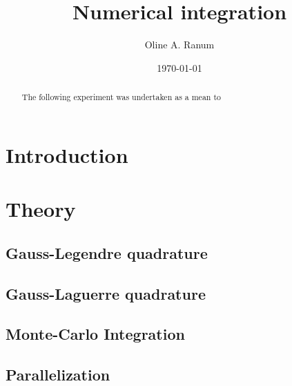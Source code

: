 \documentclass[%
reprint,
amsmath,amssymb,
aps,
]{revtex4-1}
\begin{document}
\title{Numerical integration}
\author{Oline A. Ranum}
\date{\today}


\begin{abstract}
	The following experiment was undertaken as a mean to 
\end{abstract}
\maketitle

\section{Introduction}


\section{Theory}
\subsection{Gauss-Legendre quadrature}
\subsection{Gauss-Laguerre quadrature}
\subsection{Monte-Carlo Integration}
\subsection{Parallelization}
\end{document}
